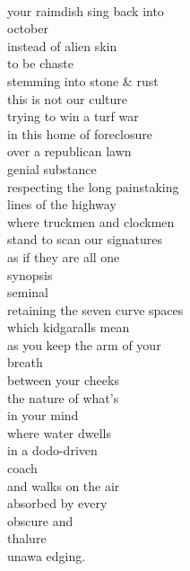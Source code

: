 \documentclass[smalldemyvopaper,11pt,twoside,onecolumn,openright,extrafontsizes]{memoir}
\begin{document}
\\your raimdish sing back into
\\october
\\instead of alien skin
\\to be chaste
\\stemming into stone \& rust
\\this is not our culture
\\trying to win a turf war
\\in this home of foreclosure
\\over a republican lawn
\\genial substance
\\respecting the long painstaking
\\lines of the highway
\\where truckmen and clockmen
\\stand to scan our signatures
\\as if they are all one
\\synopsis
\\seminal
\\retaining the seven curve spaces
\\which kidgaralls mean
\\as you keep the arm of your
\\breath
\\between your cheeks
\\the nature of what's
\\in your mind
\\where water dwells
\\in a dodo-driven
\\coach
\\and walks on the air
\\absorbed by every
\\obscure and
\\thalure
\\unawa edging.
\end{document}
